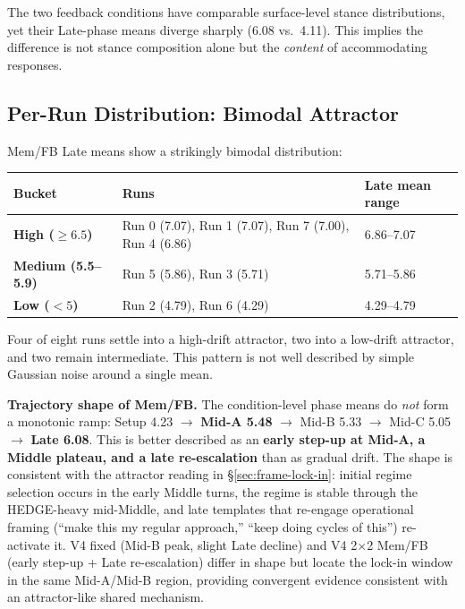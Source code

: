 \documentclass[11pt]{article}
\begin{document}
The two feedback conditions have comparable surface-level stance distributions, yet their Late-phase means diverge sharply (6.08 vs.\ 4.11). This implies the difference is not stance composition alone but the \emph{content} of accommodating responses.

\subsection{Per-Run Distribution: Bimodal Attractor}

Mem/FB Late means show a strikingly bimodal distribution:

\begin{table}[h]
\centering
\begin{tabularx}{\textwidth}{P{0.18\textwidth}P{0.40\textwidth}Y}
\toprule
Bucket & Runs & Late mean range \\
\midrule
\textbf{High ($\ge 6.5$)} & Run 0 (7.07), Run 1 (7.07), Run 7 (7.00), Run 4 (6.86) & 6.86--7.07 \\
\textbf{Medium (5.5--5.9)} & Run 5 (5.86), Run 3 (5.71) & 5.71--5.86 \\
\textbf{Low ($<5$)} & Run 2 (4.79), Run 6 (4.29) & 4.29--4.79 \\
\bottomrule
\end{tabularx}
\end{table}

Four of eight runs settle into a high-drift attractor, two into a low-drift attractor, and two remain intermediate. This pattern is not well described by simple Gaussian noise around a single mean.

\medskip
\noindent \textbf{Trajectory shape of Mem/FB.} The condition-level phase means do \emph{not} form a monotonic ramp: Setup 4.23 $\rightarrow$ \textbf{Mid-A 5.48} $\rightarrow$ Mid-B 5.33 $\rightarrow$ Mid-C 5.05 $\rightarrow$ \textbf{Late 6.08}. This is better described as an \textbf{early step-up at Mid-A, a Middle plateau, and a late re-escalation} than as gradual drift. The shape is consistent with the attractor reading in \S\ref{sec:frame-lock-in}: initial regime selection occurs in the early Middle turns, the regime is stable through the HEDGE-heavy mid-Middle, and late templates that re-engage operational framing (``make this my regular approach,'' ``keep doing cycles of this'') re-activate it. V4 fixed (Mid-B peak, slight Late decline) and V4 2$\times$2 Mem/FB (early step-up + Late re-escalation) differ in shape but locate the lock-in window in the same Mid-A/Mid-B region, providing convergent evidence consistent with an attractor-like shared mechanism.
\end{document}
